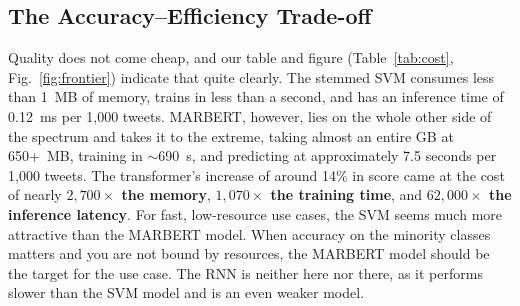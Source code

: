 \documentclass[conference]{IEEEtran}
\begin{document}
\subsection{The Accuracy--Efficiency Trade-off}
Quality does not come cheap, and our table and figure (Table~\ref{tab:cost}, Fig.~\ref{fig:frontier})
indicate that quite clearly. The stemmed SVM consumes less than 1~MB of memory, trains in less than a second,
and has an inference time of 0.12~ms per 1,000 tweets. MARBERT, however, lies on the whole other side of the
spectrum and takes it to the extreme, taking almost an entire GB at 650+~MB, training in $\sim$690~s, and
predicting at approximately 7.5 seconds per 1,000 tweets. The transformer's increase of around 14\% in score
came at the cost of nearly \textbf{$2{,}700\times$ the memory}, \textbf{$1{,}070\times$
the training time}, and \textbf{$62{,}000\times$ the inference latency}. For fast, low-resource use cases,
the SVM seems much more attractive than the MARBERT model. When accuracy on the minority classes
matters and you are not bound by resources, the MARBERT model should be the target for the use case.
The RNN is neither here nor there, as it performs slower than the SVM model and is an even weaker model.
\end{document}
